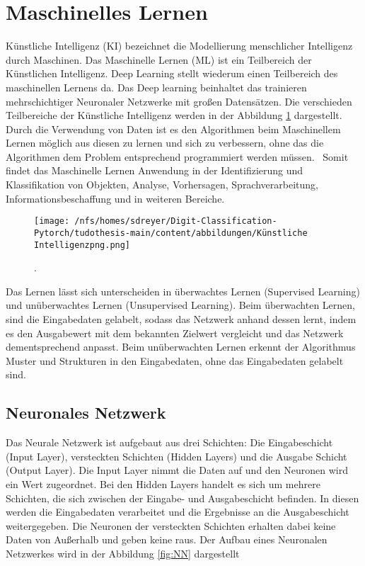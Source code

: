 \section{Maschinelles Lernen}

Künstliche Intelligenz (KI) bezeichnet die Modellierung menschlicher Intelligenz durch Maschinen. 
Das Maschinelle Lernen (ML) ist ein Teilbereich der Künstlichen Intelligenz. Deep Learning stellt 
wiederum einen Teilbereich des maschinellen Lernens da. Das Deep learning beinhaltet das trainieren mehrschichtiger Neuronaler Netzwerke mit großen Datensätzen.
Die verschieden Teilbereiche der Künstliche Intelligenz werden in der Abbildung \ref{fig:KI} dargestellt.
Durch die Verwendung von Daten ist es den Algorithmen beim 
Maschinellem Lernen möglich aus diesen zu lernen und sich zu verbessern, ohne das die Algorithmen dem Problem entsprechend programmiert werden müssen.~\cite{kleesiek2020}
Somit findet das Maschinelle Lernen Anwendung in der Identifizierung und Klassifikation von Objekten, Analyse, Vorhersagen, 
Sprachverarbeitung, Informationsbeschaffung und in weiteren Bereiche.~\cite{shinde2018}

\begin{figure}[htbp]
  \centering
  \texttt{[image: /nfs/homes/sdreyer/Digit-Classification-Pytorch/tudothesis-main/content/abbildungen/Künstliche Intelligenzpng.png]}
  \caption{.~\cite{kleesiek2020}}
  \label{fig:KI}
\end{figure}

Das Lernen lässt sich unterscheiden in überwachtes Lernen (Supervised Learning) und unüberwachtes Lernen (Unsupervised Learning).
Beim überwachten Lernen, sind die Eingabedaten gelabelt, sodass das Netzwerk anhand dessen lernt, indem es den Ausgabewert mit dem bekannten Zielwert 
vergleicht und das Netzwerk dementsprechend anpasst.
Beim unüberwachten Lernen erkennt der Algorithmus Muster und Strukturen in den Eingabedaten, ohne das Eingabedaten gelabelt sind.~\cite{kleesiek2020}


\subsection{Neuronales Netzwerk}

Das Neurale Netzwerk ist aufgebaut aus drei Schichten: 
Die Eingabeschicht (Input Layer), versteckten Schichten (Hidden Layers) und die Ausgabe Schicht (Output Layer).
Die Input Layer nimmt die Daten auf und den Neuronen wird ein Wert zugeordnet.
Bei den Hidden Layers handelt es sich um mehrere Schichten, die sich zwischen der Eingabe- und Ausgabeschicht befinden.
In diesen werden die Eingabedaten verarbeitet und die Ergebnisse an die Ausgabeschicht weitergegeben.
Die Neuronen der versteckten Schichten erhalten dabei keine Daten von Außerhalb und geben keine raus. 
Der Aufbau eines Neuronalen Netzwerkes wird in der Abbildung \ref{fig:NN} dargestellt

